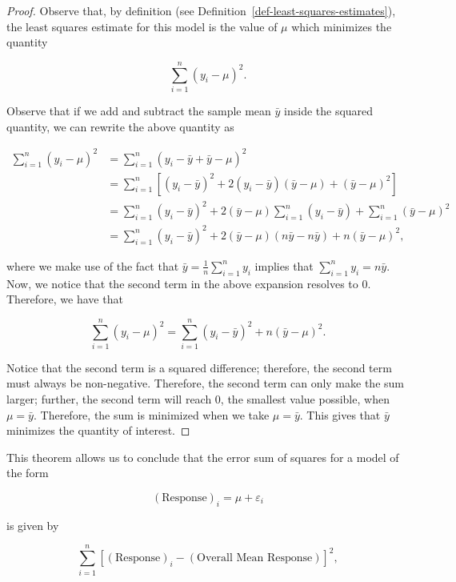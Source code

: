 \documentclass[
  letterpaper,
  DIV=11,
  numbers=noendperiod]{scrreprt}
\theoremstyle{plain}
\theoremstyle{definition}
\theoremstyle{definition}
\theoremstyle{remark}
\begin{document}
\begin{proof}
Observe that, by definition (see
Definition~\ref{def-least-squares-estimates}), the least squares
estimate for this model is the value of \(\mu\) which minimizes the
quantity

\[\sum_{i=1}^{n} \left(y_i - \mu\right)^2.\]

Observe that if we add and subtract the sample mean \(\bar{y}\) inside
the squared quantity, we can rewrite the above quantity as

\[
\begin{aligned}
  \sum_{i=1}^{n} \left(y_i - \mu\right)^2 
    &= \sum_{i=1}^{n} \left(y_i - \bar{y} + \bar{y} - \mu\right)^2 \\
    &= \sum_{i=1}^{n} \left[\left(y_i - \bar{y}\right)^2 + 2\left(y_i - \bar{y}\right)\left(\bar{y} - \mu\right) + \left(\bar{y} - \mu\right)^2\right] \\
    &= \sum_{i=1}^{n} \left(y_i - \bar{y}\right)^2 + 2\left(\bar{y} - \mu\right) \sum_{i=1}^{n}\left(y_i - \bar{y}\right) + \sum_{i=1}^{n}\left(\bar{y} - \mu\right)^2 \\
    &= \sum_{i=1}^{n} \left(y_i - \bar{y}\right)^2 + 2\left(\bar{y} - \mu\right) \left(n\bar{y} - n\bar{y}\right) + n\left(\bar{y} - \mu\right)^2, 
\end{aligned}
\]

where we make use of the fact that
\(\bar{y} = \frac{1}{n}\sum_{i=1}^{n} y_i\) implies that
\(\sum_{i=1}^{n} y_i = n\bar{y}\). Now, we notice that the second term
in the above expansion resolves to 0. Therefore, we have that

\[\sum_{i=1}^{n} \left(y_i - \mu\right)^2 = \sum_{i=1}^{n} \left(y_i - \bar{y}\right)^2 + n\left(\bar{y} - \mu\right)^2.\]

Notice that the second term is a squared difference; therefore, the
second term must always be non-negative. Therefore, the second term can
only make the sum larger; further, the second term will reach 0, the
smallest value possible, when \(\mu = \bar{y}\). Therefore, the sum is
minimized when we take \(\mu = \bar{y}\). This gives that \(\bar{y}\)
minimizes the quantity of interest.
\end{proof}

This theorem allows us to conclude that the error sum of squares for a
model of the form

\[(\text{Response})_i = \mu + \varepsilon_i\]

is given by

\[\sum_{i=1}^{n} \left[(\text{Response})_i - (\text{Overall Mean Response})\right]^2,\]
\end{document}
